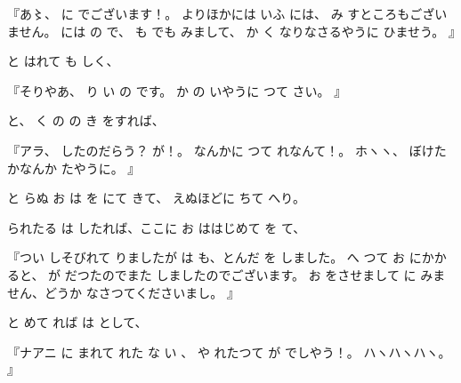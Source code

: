 『あ〻、%
に
でございます！。
よりほかには
いふ
には、
み
すところもございません。
には
の
で、
も
でも
みまして、
か
く
なりなさるやうに
ひませう。
』

と
はれて
も
しく、

『そりやあ、
り
い
の
です。
か
の
いやうに
つて
さい。
』

と、
く
の
の
き
をすれば、

『アラ、
したのだらう？
が！。
なんかに
つて
れなんて！。
ホヽヽ、
ぼけた
かなんか
たやうに。
』

と
らぬ
お
は
を
にて
きて、
えぬほどに
ちて
へり。

られたる
は
したれば、ここに
お
ははじめて
を
て、

『つい
しそびれて
りましたが
は
も、とんだ
を
しました。
へ
つて
お
にかかると、
が
だつたのでまた
しましたのでございます。
お
をさせまして
に
みません、どうか
なさつてくださいまし。
』

と
めて
れば
は
として、

『ナアニ
に
まれて
れた
な
い
、
や
れたつて
が
でしやう！。
ハヽハヽハヽ。
』

